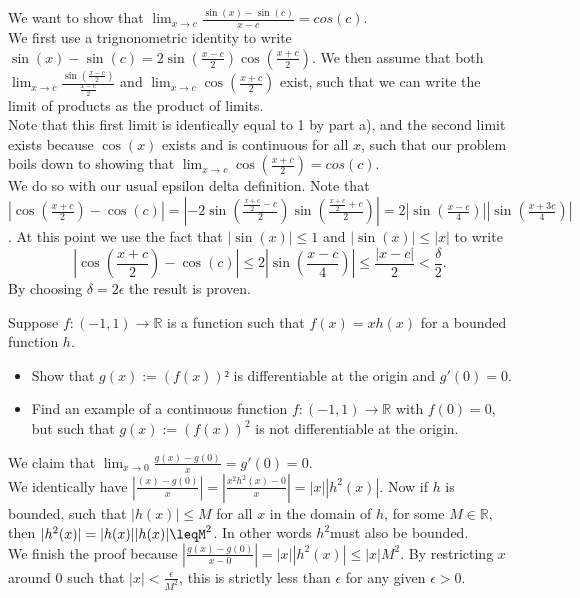 \documentclass[11 pt]{article}
\begin{document}
\begin{solution}
	We want to show that $\lim_{x\to c}\frac{\sin(x)-\sin(c)}{x-c}=cos(c)$.\\
	We first use a trignonometric identity to write $\sin(x)-\sin(c)=2\sin(\frac{x-c}{2})\cos(\frac{x+c}{2})$. We then assume that both $\lim_{x\to c}\frac{\sin(\frac{x-c}{2})}{\frac{x-c}{2}}$ and $\lim_{x\to c}\cos(\frac{x+c}{2})$ exist, such that we can write the limit of products as the product of limits.\\
	Note that this first limit is identically equal to 1 by part a), and the second limit exists because $\cos(x)$ exists and is continuous for all $x$, such that our problem boils down to showing that $\lim_{x\to c}\cos(\frac{x+c}{2})=cos(c)$.\\
	We do so with our usual epsilon delta definition. Note that $|\cos(\frac{x+c}{2})-\cos(c)|=|-2\sin(\frac{\frac{x+c}{2}-c}{2})\sin(\frac{\frac{x+c}{2}+c}{2})|=2|\sin(\frac{x-c}{4})||\sin(\frac{x+3c}{4})|$. At this point we use the fact that $|\sin(x)|\leq 1$ and $|\sin(x)|\leq|x|$ to write \[
	|\cos(\frac{x+c}{2})-\cos(c)|\leq 2|\sin(\frac{x-c}{4})|\leq\frac{|x-c|}{2}<\frac{\delta}{2}
	.\] 
	By choosing $\delta=2\epsilon$ the result is proven.
\end{solution}
\pagebreak
\begin{problem}
	Suppose $f:(-1,1)\to\mathbb{R}$ is a function such that $f(x)=xh(x)$ for a bounded function $h$.
	\begin{itemize}
		\item Show that $g(x):=(f(x))²$ is differentiable at the origin and $g'(0)=0$.
		\item Find an example of a continuous function $f:(-1,1)\to\mathbb{R}$ with $f(0)=0$, but such that $g(x):=(f(x))^2$ is not differentiable at the origin.
	\end{itemize}
\end{problem}
\begin{solution}
	We claim that $\lim_{x\to 0}\frac{g(x)-g(0)}{x}=g'(0)=0$.\\
	We identically have $|\frac{(x)-g(0)}{x}|=|\frac{x^2h^2(x)-0}{x}|=|x||h^2(x)|$. Now if $h$ is bounded, such that $|h(x)|\leq M$ for all $x$ in the domain of $h$, for some $M\in\mathbb{R}$, then $|h^2(x)|=|h(x)||h(x)|\leqM^2$. In other words $h^2$must also be bounded. \\
	We finish the proof because $|\frac{g(x)-g(0)}{x-0}|=|x||h^2(x)|\leq |x|M^2$. By restricting $x$ around 0 such that $|x|<\frac{\epsilon}{M^2}$, this is strictly less than $\epsilon$ for any given $\epsilon>0$.
\end{solution}
\end{document}
